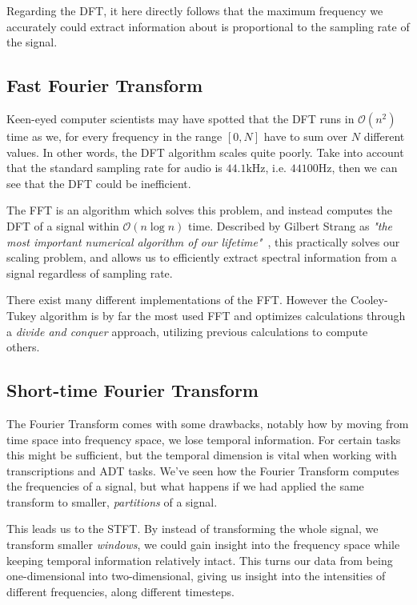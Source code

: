 Regarding the \gls{DFT}, it here directly follows that the maximum frequency we accurately could extract information about is proportional to the sampling rate of the signal.

\subsection{Fast Fourier Transform}

Keen-eyed computer scientists may have spotted that the \gls{DFT} runs in $\mathcal{O}(n^2)$ time as we, for every frequency in the range $[0, N]$ have to sum over $N$ different values. In other words, the \gls{DFT} algorithm scales quite poorly. Take into account that the standard sampling rate for audio is $44.1 \text{kHz}$, i.e. $44100 \text{Hz}$, then we can see that the \gls{DFT} could be inefficient.~\cite{pras2010sampling}

The \gls{FFT} is an algorithm which solves this problem, and instead computes the \gls{DFT} of a signal within $\mathcal{O}(n\log{n})$ time. Described by Gilbert Strang as \textit{"the most important numerical algorithm of our lifetime"}~\cite{strang1993wavelettransformsversusfourier}, this practically solves our scaling problem, and allows us to efficiently extract spectral information from a signal regardless of sampling rate.

There exist many different implementations of the \gls{FFT}. However the Cooley-Tukey algorithm is by far the most used \gls{FFT} and optimizes calculations through a \textit{divide and conquer} approach, utilizing previous calculations to compute others.~\cite{d3ea2d52-5ab2-3128-8b80-efb85267295d}

\subsection{Short-time Fourier Transform}

The Fourier Transform comes with some drawbacks, notably how by moving from time space into frequency space, we lose temporal information. For certain tasks this might be sufficient, but the temporal dimension is vital when working with transcriptions and \gls{ADT} tasks. We've seen how the Fourier Transform computes the frequencies of a signal, but what happens if we had applied the same transform to smaller, \textit{partitions} of a signal.

This leads us to the \gls{STFT}. By instead of transforming the whole signal, we transform smaller \textit{windows}, we could gain insight into the frequency space while keeping temporal information relatively intact. This turns our data from being one-dimensional into two-dimensional, giving us insight into the intensities of different frequencies, along different timesteps.

